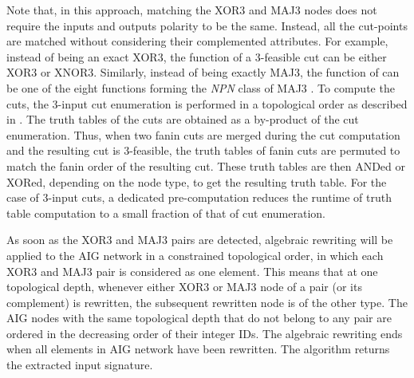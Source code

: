 Note that, in this approach, matching the XOR3 and MAJ3 nodes does not require the inputs and outputs polarity to be the same. Instead, all the cut-points are matched without considering their complemented attributes. For example, instead of being an exact XOR3, the function of a 3-feasible cut can be either XOR3 or XNOR3. Similarly, instead of being exactly MAJ3, the function of can be one of the eight functions forming the \textit{NPN} class of MAJ3 \cite{HuangWNM13}. To compute the cuts, the 3-input cut enumeration is performed in a topological order as described in \cite{PanL98}. The truth tables of the cuts are obtained as a by-product of the cut enumeration. Thus, when two fanin cuts are merged during the cut computation and the resulting cut is 3-feasible, the truth tables of fanin cuts are permuted to match the fanin order of the resulting cut. These truth tables are then ANDed or XORed, depending on the node type, to get the resulting truth table. For the case of 3-input cuts, a dedicated pre-computation reduces the runtime of truth table computation to a small fraction of that of cut enumeration.


As soon as the XOR3 and MAJ3 pairs are detected, algebraic rewriting will be applied to the AIG network in a constrained topological order, in which each XOR3 and MAJ3 pair is considered as one element. This means that at one topological depth, whenever either XOR3 or MAJ3 node of a pair (or its complement) is rewritten, the subsequent rewritten node is of the other type. The AIG nodes with the same topological depth that do not belong to any pair are ordered in the decreasing order of their integer IDs. The algebraic rewriting ends when all elements in AIG network have been rewritten. The algorithm returns the extracted input signature. 


%




